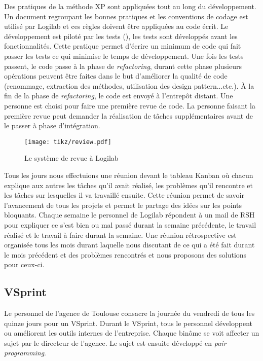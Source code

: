 Des pratiques de la méthode XP sont appliquées tout au long du développement. Un document regroupant les bonnes pratiques et les conventions de codage est utilisé par Logilab et ces règles doivent être appliquées au code écrit. Le développement est piloté par les tests (), les tests sont développés avant les fonctionnalités. Cette pratique permet d'écrire un minimum de code qui fait passer les tests ce qui minimise le temps de développement. Une fois les tests passent, le code passe à la phase de \textit{refactoring}, durant cette phase plusieurs opérations peuvent être faites dans le but d'améliorer la qualité de code (renommage, extraction des méthodes, utilisation des design pattern...etc.). \`A la fin de la phase de \textit{refactoring}, le code est envoyé à l’entrepôt distant. Une personne est choisi pour faire une première revue de code. La personne faisant la première revue peut demander la réalisation de tâches supplémentaires avant de le passer à phase d'intégration. 

\begin{figure}
\centering
  \texttt{[image: tikz/review.pdf]}
  \caption{Le système de revue à Logilab}
  \label{fig:review}
\end{figure}

Tous les jours nous effectuions une réunion devant le tableau Kanban où chacun explique aux autres les tâches qu'il avait réalisé, les problèmes qu'il rencontre et les tâches sur lesquelles il va travaillé ensuite. Cette réunion permet de savoir l'avancement de tous les projets et permet le partage des idées sur les points bloquants. Chaque semaine le personnel de Logilab répondent à un mail de RSH pour expliquer ce s'est bien ou mal passé durant la semaine précédente, le travail réalisé et le travail à faire durant la semaine. Une réunion rétrospective est organisée tous les mois durant laquelle nous discutant de ce qui a été fait durant le mois précédent et des problèmes rencontrés et nous proposons des solutions pour ceux-ci. 

\subsection{VSprint}
Le personnel de l'agence de Toulouse consacre la journée du vendredi de tous les quinze jours pour un VSprint. Durant le VSprint, tous le personnel développent ou améliorent les outils internes de l'entreprise. Chaque binôme se voit affecter un sujet par le directeur de l'agence. Le sujet est ensuite développé en \textit{pair programming}.

